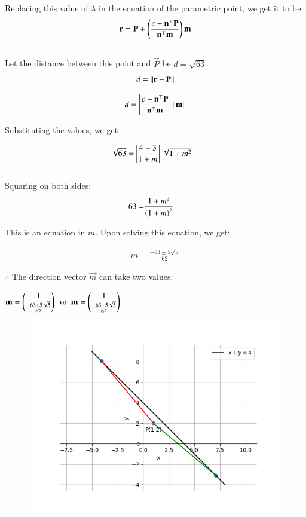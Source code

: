 \documentclass[journal]{IEEEtran}
\begin{document}
Replacing this value of $\lambda$ in the equation of the parametric point, we get it to be
\begin{align}
    \mathbf{r} = \mathbf{P} + \left(\frac{c-\mathbf{n}^\top\mathbf{P}}{\mathbf{n}^\top\mathbf{m}}\right)\mathbf{m}
\end{align}\\

Let the distance between this point and $\vec{P}$ be $d = \sqrt{63}$. 
\begin{align}
    d = \left\lVert\mathbf{r} - \mathbf{P}\right\rVert
\end{align}

\begin{align}
    d = \left\vert\frac{c-\mathbf{n}^\top\mathbf{P}}{\mathbf{n}^\top\mathbf{m}}\right\vert\left\lVert\mathbf{m}\right\rVert
\end{align}

Substituting the values, we get

\begin{align}
    \sqrt{63} =& \left\vert\frac{4-3}{1+m}\right\vert\sqrt{1+m^2}
\end{align}\\

Squaring on both sides:
\begin{align}
    63 =& \frac{1+m^2}{\left(1+m\right)^2}
\end{align}

This is an equation in $m$. Upon solving this equation, we get:

\begin{align}
    m = \frac{-63 \pm 5\sqrt{5}}{62}
\end{align}

$\therefore$ The direction vector $\vec{m}$ can take two values:
\begin{center}
    $\mathbf{m} = \begin{pmatrix}1\\\frac{-63 + 5\sqrt{5}}{62}\end{pmatrix} \ \ \text{or} \ \ \mathbf{m} = \begin{pmatrix}1\\\frac{-63 - 5\sqrt{5}}{62}\end{pmatrix}$
\end{center}

\begin{figure}[H]
    \centering
    \includegraphics[width=0.9\linewidth]{Figs/plot(py+C).png}
\end{figure}
\end{document}

